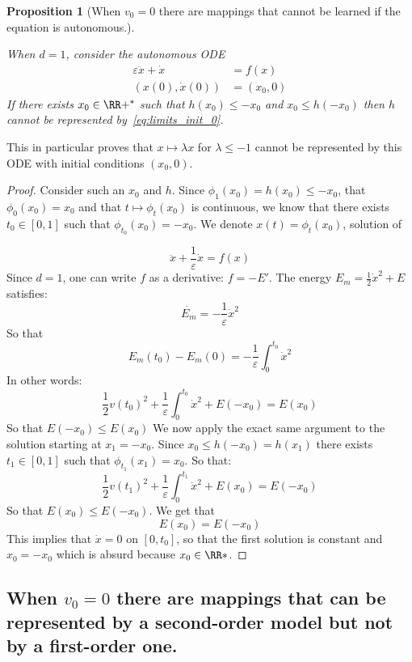 \documentclass{article}
\newtheorem{proposition}{Proposition}
\begin{document}
\begin{proposition}[When $v_0 = 0$ there are mappings that cannot be learned if the equation is autonomous.]\label{proposition:limits_init_0}

When $d = 1$, consider the autonomous ODE \begin{equation}\label{eq:limits_init_0}
\begin{split}
\varepsilon \ddot{x} + \dot{x} &= f(x) \\
(x(0),\dot{x}(0)) &= (x_0,0)
\end{split}
\end{equation}
If there exists $x_0 \in \RR+^{*}$ such that $h(x_0) \leq -x_0 $  and $x_0 \leq h(-x_0)$ then $h$ cannot be represented by~\eqref{eq:limits_init_0}.
\end{proposition}
This in particular proves that $x \mapsto \lambda x$ for $\lambda \leq -1$ cannot be represented by this ODE with initial conditions $(x_0,0)$. 


 \begin{proof}
 Consider such an $x_0$ and $h$. Since $\phi_1 (x_0) = h(x_0) \leq -x_0$, that $\phi_0(x_0) = x_0$ and that $t \mapsto \phi_t(x_0)$ is continuous, we know that there exists $t_0 \in [0,1]$ such that $\phi_{t_0}(x_0) = -x_0$.
We denote $x(t) = \phi_t(x_0) $, solution of 

$$
     \ddot{x} + \frac{1}{\varepsilon} \dot{x} = f(x)
$$
Since $d = 1$, one can write $f$ as a derivative: $f=-E'$. 
The energy $E_m = \frac{1}{2}\dot{x}^2 + E$ satisfies: 
$$
\dot{E_m} = -\frac{1}{\varepsilon}\dot{x}^2
$$
So that 
$$
E_m(t_0) - E_m(0) = -\frac{1}{\varepsilon} \int_{0}^{t_0}\dot{x}^2
$$
In other words: 
$$
\frac{1}{2}v(t_0)^2 + \frac{1}{\varepsilon} \int_{0}^{t_0}\dot{x}^2 + E(-x_0) = E(x_0)
$$
So that $E(-x_0) \leq E(x_0)$
We now apply the exact same argument to the solution starting at $x_1 = -x_0$. Since $x_0 \leq h(-x_0) = h(x_1)$ there exists $t_1 \in [0,1]$ such that $\phi_{t_1}(x_1) = x_0$. So that:
$$
\frac{1}{2}v(t_1)^2 + \frac{1}{\varepsilon} \int_{0}^{t_1}\dot{x}^2 + E(x_0) = E(-x_0)
$$
So that $E(x_0) \leq E(-x_0)$.
We get that 
$$
E(x_0) = E(-x_0)
$$
This implies that $\dot{x} = 0$ on $[0,t_0]$, so that the first solution is constant and $x_0 = -x_0$ which is absurd because $x_0 \in \RR*$.
\end{proof}
\subsection{When $v_0 = 0$ there are mappings that can be represented by a second-order model but not by a first-order one.}\label{app:prop_lambda}
\end{document}

